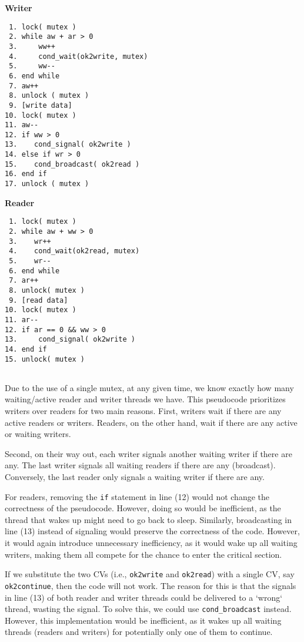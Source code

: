 \begin{multicols}{2}
    \textbf{Writer}\vspace{-2em}
    \begin{verbatim}
 1. lock( mutex )
 2. while aw + ar > 0
 3.     ww++
 4.     cond_wait(ok2write, mutex)
 5.     ww--
 6. end while
 7. aw++
 8. unlock ( mutex )
 9. [write data]
10. lock( mutex )
11. aw--
12. if ww > 0
13.    cond_signal( ok2write )
14. else if wr > 0
15.    cond_broadcast( ok2read )
16. end if
17. unlock ( mutex )
    \end{verbatim}
    \columnbreak
    \textbf{Reader}\vspace{-2em}
    \begin{verbatim}
 1. lock( mutex )
 2. while aw + ww > 0
 3.    wr++
 4.    cond_wait(ok2read, mutex)
 5.    wr--
 6. end while
 7. ar++
 8. unlock( mutex )
 9. [read data]
10. lock( mutex )
11. ar--
12. if ar == 0 && ww > 0
13.     cond_signal( ok2write )
14. end if
15. unlock( mutex )


    \end{verbatim}
\end{multicols}
\vspace{-2em}


Due to the use of a single mutex, at any given time, we know exactly how many waiting/active reader and writer threads we have.
This pseudocode prioritizes writers over readers for two main reasons.
First, writers wait if there are any active readers or writers.
Readers, on the other hand, wait if there are any active or waiting writers.

Second, on their way out, each writer signals another waiting writer if there are any.
The last writer signals all waiting readers if there are any (broadcast).
Conversely, the last reader only signals a waiting writer if there are any.

For readers, removing the \texttt{if} statement in line (12) would not change the correctness of the pseudocode.
However, doing so would be inefficient, as the thread that wakes up might need to go back to sleep.
Similarly, broadcasting in line (13) instead of signaling would preserve the correctness of the code.
However, it would again introduce unnecessary inefficiency, as it would wake up all waiting writers, making them all compete for the chance to enter the critical section.

If we substitute the two CVs (i.e., \texttt{ok2write} and \texttt{ok2read}) with a single CV, say \texttt{ok2continue}, then the code will not work.
The reason for this is that the signals in line (13) of both reader and writer threads could be delivered to a `wrong` thread, wasting the signal.
To solve this, we could use \texttt{cond\_broadcast} instead.
However, this implementation would be inefficient, as it wakes up all waiting threads (readers and writers) for potentially only one of them to continue.

